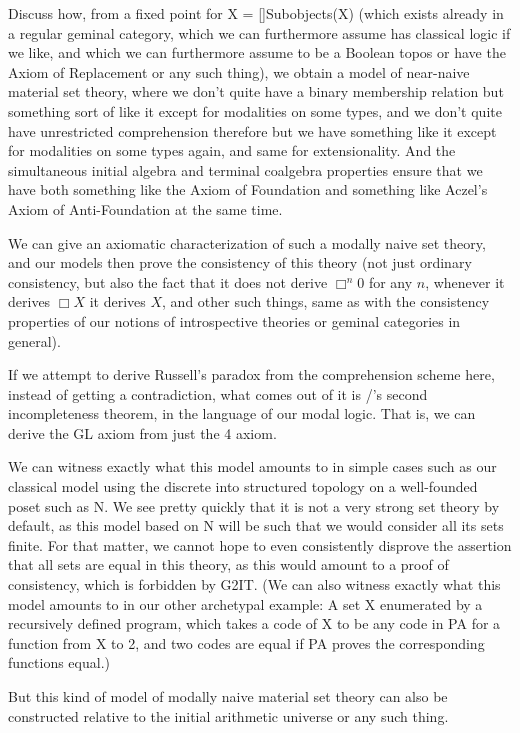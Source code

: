 \begin{TODOblock}
Discuss how, from a fixed point for X = []Subobjects(X) (which exists already in a regular geminal category, which we can furthermore assume has classical logic if we like, and which we can furthermore assume to be a Boolean topos or have the Axiom of Replacement or any such thing), we obtain a model of near-naive material set theory, where we don't quite have a binary membership relation but something sort of like it except for modalities on some types, and we don't quite have unrestricted comprehension therefore but we have something like it except for modalities on some types again, and same for extensionality. And the simultaneous initial algebra and terminal coalgebra properties ensure that we have both something like the Axiom of Foundation and something like Aczel's Axiom of Anti-Foundation at the same time.

We can give an axiomatic characterization of such a modally naive set theory, and our models then prove the consistency of this theory (not just ordinary consistency, but also the fact that it does not derive $\Box^n 0$ for any $n$, whenever it derives $\Box X$ it derives $X$, and other such things, same as with the consistency properties of our notions of introspective theories or geminal categories in general).

If we attempt to derive Russell's paradox from the comprehension scheme here, instead of getting a contradiction, what comes out of it is \Goedel/'s second incompleteness theorem, in the language of our modal logic. That is, we can derive the GL axiom from just the 4 axiom.

We can witness exactly what this model amounts to in simple cases such as our classical model using the discrete into structured topology on a well-founded poset such as N. We see pretty quickly that it is not a very strong set theory by default, as this model based on N will be such that we would consider all its sets finite. For that matter, we cannot hope to even consistently disprove the assertion that all sets are equal in this theory, as this would amount to a proof of consistency, which is forbidden by G2IT. (We can also witness exactly what this model amounts to in our other archetypal example: A set X enumerated by a recursively defined program, which takes a code of X to be any code in PA for a function from X to 2, and two codes are equal if PA proves the corresponding functions equal.)

But this kind of model of modally naive material set theory can also be constructed relative to the initial arithmetic universe or any such thing.


\end{TODOblock}
